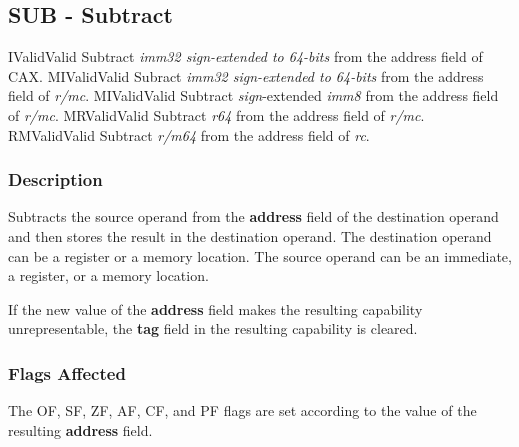 \clearpage
{}
{}
\subsection*{SUB - Subtract}

\begin{x86opcodetable}
  {I}{Valid}{Valid}
  {Subtract \emph{imm32 sign-extended to 64-bits} from the address field of
    CAX.}
  {MI}{Valid}{Valid}
  {Subract \emph{imm32 sign-extended to 64-bits} from the address field of
    \emph{r/mc}.}
  {MI}{Valid}{Valid}
  {Subtract \emph{sign}-extended \emph{imm8} from the address field of
    \emph{r/mc}.}
  {MR}{Valid}{Valid}
  {Subtract \emph{r64} from the address field of \emph{r/mc}.}
  {RM}{Valid}{Valid}
  {Subtract \emph{r/m64} from the address field of \emph{rc}.}
\end{x86opcodetable}

\begin{x86opentable}
\end{x86opentable}

\subsubsection*{Description}

Subtracts the source operand from the \textbf{address} field of the
destination operand and then stores the result in the destination
operand. The destination operand can be a register or a memory
location. The source operand can be an immediate, a register, or a
memory location.

If the new value of the \textbf{address} field makes the resulting
capability unrepresentable, the \textbf{tag} field in the resulting
capability is cleared.

\subsubsection*{Flags Affected}

The OF, SF, ZF, AF, CF, and PF flags are set according to the value of
the resulting \textbf{address} field.
